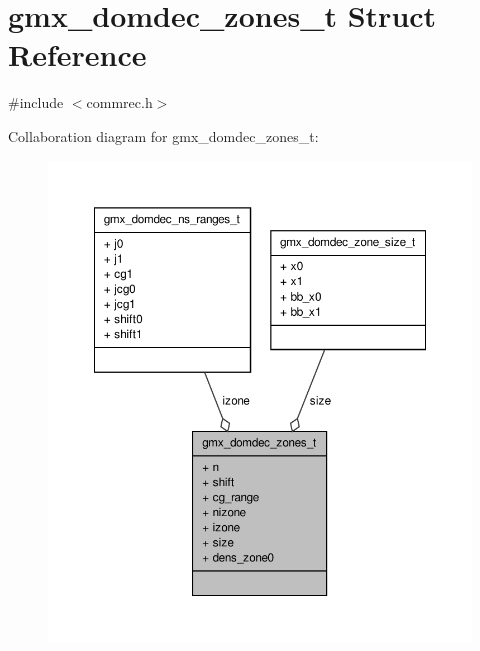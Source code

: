 \hypertarget{structgmx__domdec__zones__t}{\section{gmx\-\_\-domdec\-\_\-zones\-\_\-t \-Struct \-Reference}
\label{structgmx__domdec__zones__t}
}


{\ttfamily \#include $<$commrec.\-h$>$}



\-Collaboration diagram for gmx\-\_\-domdec\-\_\-zones\-\_\-t\-:
\nopagebreak
\begin{figure}[H]
\begin{center}
\leavevmode
\includegraphics[width=350pt]{structgmx__domdec__zones__t__coll__graph}
\end{center}
\end{figure}
